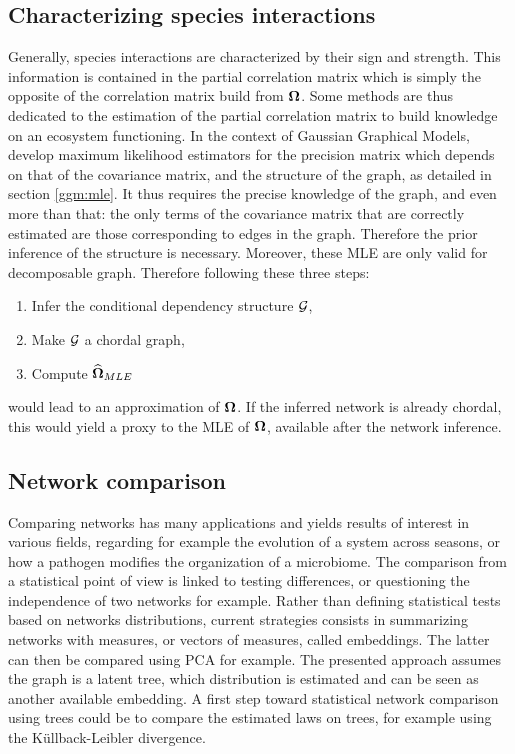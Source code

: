 \subsection{Characterizing species interactions}


Generally, species interactions are characterized by their sign and strength. This information is contained in  the partial correlation matrix which is simply the opposite of the correlation matrix build from ${\boldsymbol{\Omega}}$. Some methods are thus dedicated to the estimation of the partial correlation matrix to build knowledge on an ecosystem functioning. In the context of Gaussian Graphical Models, \cite{Lau96} develop maximum likelihood estimators for the precision matrix which depends on that of the covariance matrix, and the structure of the graph, as detailed in section \ref{ggm:mle}. It thus requires the precise knowledge of the graph, and even more than that: the only terms of the covariance matrix that are correctly estimated are those corresponding to edges in the graph. Therefore the prior inference of the structure is necessary. Moreover, these MLE are only valid for decomposable graph. Therefore following these three steps: 
\begin{enumerate}
\item Infer the conditional dependency structure $\mathcal{G}$,
\item Make $\mathcal{G}$ a chordal graph,
\item Compute $\widehat{{\boldsymbol{\Omega}}}_{MLE}$
\end{enumerate}
 would lead to an approximation of ${\boldsymbol{\Omega}}$. If the inferred network is already chordal, this would yield a proxy to the MLE of ${\boldsymbol{\Omega}}$, available after the network inference.


\subsection{Network comparison}
 
Comparing networks has many applications and  yields results of interest in various fields, regarding for example the evolution of a system across seasons, or how a pathogen modifies the organization of a microbiome.
The comparison from a statistical point of view is linked to testing differences, or questioning the independence of two networks for example.  Rather than defining statistical tests based on networks distributions, current strategies consists in summarizing networks with measures, or vectors of measures, called embeddings. The latter can then be compared using PCA for example.
The presented approach assumes the graph is a latent tree, which distribution is estimated and can be seen as another available embedding. A first step toward statistical network comparison using trees could be to compare the estimated laws on trees, for example using the Küllback-Leibler divergence.

